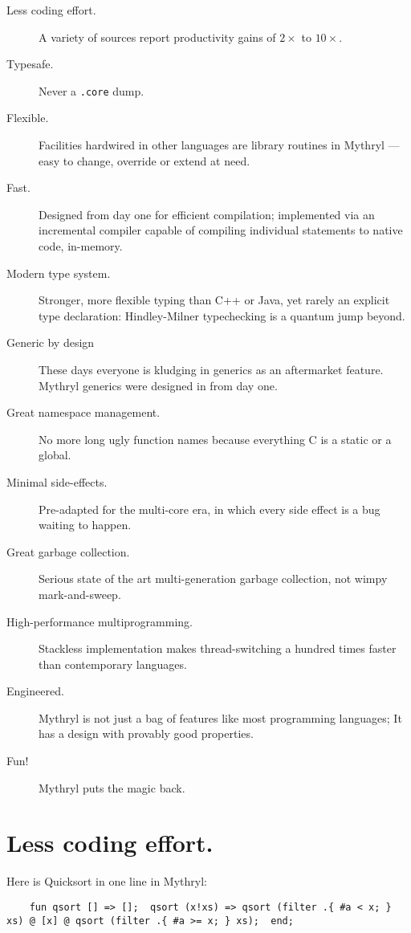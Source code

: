 \begin{description}
\item[Less coding effort.]  A variety of sources report productivity gains of $2\times$ to $10\times$.
\item[Typesafe.]  Never a \verb#.core# dump.
\item[Flexible.]  Facilities hardwired in other languages are library routines in Mythryl --- easy to change, override or extend at need.
\item[Fast.]  Designed from day one for efficient compilation;  implemented via an incremental compiler capable of compiling individual statements to native code, in-memory.
\item[Modern type system.] Stronger, more flexible typing than C++ or Java, yet rarely an explicit type declaration:  Hindley-Milner typechecking is a quantum jump beyond.
\item[Generic by design]  These days everyone is kludging in generics as an aftermarket feature.  Mythryl generics were designed in from day one.
\item[Great namespace management.]  No more long ugly function names because everything C is a static or a global.
\item[Minimal side-effects.]  Pre-adapted for the multi-core era, in which every side effect is a bug waiting to happen.
\item[Great garbage collection.]  Serious state of the art multi-generation garbage collection, not wimpy mark-and-sweep.
\item[High-performance multiprogramming.]  Stackless implementation makes thread-switching a hundred times faster than contemporary languages.
\item[Engineered.] Mythryl is not just a bag of features like most programming languages;  It has a design with provably good properties.
\item[Fun!]  Mythryl puts the magic back.
\end{description}


\section{Less coding effort.}

Here is Quicksort in one line in Mythryl:

\begin{verbatim}
    fun qsort [] => [];  qsort (x!xs) => qsort (filter .{ #a < x; } xs) @ [x] @ qsort (filter .{ #a >= x; } xs);  end;
\end{verbatim}

